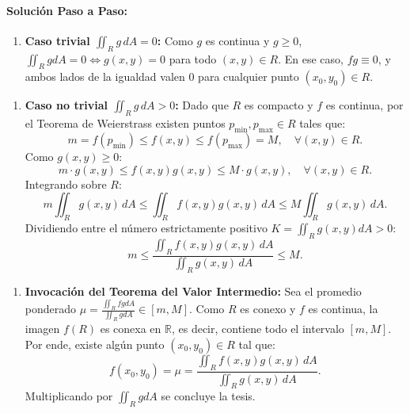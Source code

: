 \documentclass[11pt,a4paper]{article}
\begin{document}
\paragraph{Solución Paso a Paso:}\par
\begin{enumerate}[label=\textbf{\arabic*.}]
\item \textbf{Caso trivial $\iint_R g \, dA = 0$:}
Como $g$ es continua y $g \ge 0$, $\iint_R g dA = 0 \iff g(x,y) = 0$ para todo $(x,y) \in R$.
En ese caso, $fg \equiv 0$, y ambos lados de la igualdad valen 0 para cualquier punto $(x_0, y_0) \in R$.
\end{enumerate}

\begin{enumerate}[label=\textbf{\arabic*.}]
\item \textbf{Caso no trivial $\iint_R g \, dA > 0$:}
Dado que $R$ es compacto y $f$ es continua, por el Teorema de Weierstrass existen puntos $p_{\min}, p_{\max} \in R$ tales que:
\begin{equation*}
m = f(p_{\min}) \le f(x,y) \le f(p_{\max}) = M, \quad \forall (x,y) \in R.
\end{equation*}
Como $g(x,y) \ge 0$:
\begin{equation*}
m \cdot g(x,y) \le f(x,y) g(x,y) \le M \cdot g(x,y), \quad \forall (x,y) \in R.
\end{equation*}
Integrando sobre $R$:
\begin{equation*}
m \iint_R g(x,y) \, dA \le \iint_R f(x,y) g(x,y) \, dA \le M \iint_R g(x,y) \, dA.
\end{equation*}
Dividiendo entre el número estrictamente positivo $K = \iint_R g(x,y) dA > 0$:
\begin{equation*}
m \le \frac{\iint_R f(x,y) g(x,y) \, dA}{\iint_R g(x,y) \, dA} \le M.
\end{equation*}
\end{enumerate}

\begin{enumerate}[label=\textbf{\arabic*.}]
\item \textbf{Invocación del Teorema del Valor Intermedio:}
Sea el promedio ponderado $\mu = \frac{\iint_R fg dA}{\iint_R g dA} \in [m, M]$.
Como $R$ es conexo y $f$ es continua, la imagen $f(R)$ es conexa en $\mathbb{R}$, es decir, contiene todo el intervalo $[m, M]$.
Por ende, existe algún punto $(x_0, y_0) \in R$ tal que:
\begin{equation*}
f(x_0, y_0) = \mu = \frac{\iint_R f(x,y) g(x,y) \, dA}{\iint_R g(x,y) \, dA}.
\end{equation*}
Multiplicando por $\iint_R g dA$ se concluye la tesis.
\end{enumerate}
\end{document}
